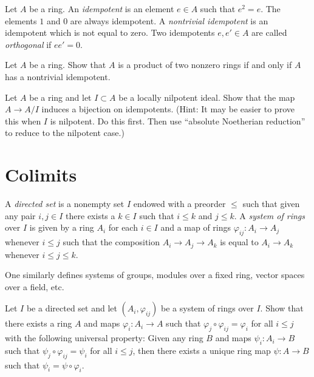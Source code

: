 \noindent
Let $A$ be a ring. An {\it idempotent} is an element $e \in A$
such that $e^2 = e$. The elements $1$ and $0$ are always idempotent.
A {\it nontrivial idempotent} is an idempotent which is not
equal to zero. Two idempotents $e, e' \in A$ are called {\it orthogonal}
if $ee' = 0$.

\begin{exercise}
\label{exercise-product}
Let $A$ be a ring. Show that $A$ is a product of two nonzero rings if
and only if $A$ has a nontrivial idempotent.
\end{exercise}

\begin{exercise}
\label{exercise-lift-idempotents}
Let $A$ be a ring and let $I \subset A$ be a locally nilpotent ideal.
Show that the map $A \to A/I$ induces a bijection on idempotents.
(Hint: It may be easier to prove this when $I$ is nilpotent. Do this first.
Then use ``absolute Noetherian reduction'' to reduce to the nilpotent case.)
\end{exercise}








\section{Colimits}
\label{section-colimits}


\begin{definition}
\label{definition-directed-poset}
A {\it directed set} is a nonempty set $I$ endowed with a preorder $\leq$
such that given any pair $i, j \in I$ there exists a $k \in I$ such that
$i \leq k$ and $j \leq k$. A {\it system of rings} over $I$ is given by a
ring $A_i$ for each $i \in I$ and a map of rings $\varphi_{ij} : A_i \to A_j$
whenever $i \leq j$ such that the composition $A_i \to A_j \to A_k$ is equal to
$A_i \to A_k$ whenever $i \leq j \leq k$.
\end{definition}

\noindent
One similarly defines systems of groups, modules over a fixed ring,
vector spaces over a field, etc.

\begin{exercise}
\label{exercise-directed-colimit}
Let $I$ be a directed set and let
$(A_i, \varphi_{ij})$ be a system of rings over $I$.
Show that there exists a ring $A$ and maps $\varphi_i : A_i \to A$
such that $\varphi_j \circ \varphi_{ij} = \varphi_i$ for all $i \leq j$
with the following universal property: Given any ring $B$
and maps $\psi_i : A_i \to B$ such that
$\psi_j \circ \varphi_{ij} = \psi_i$ for all $i \leq j$, then
there exists a unique ring map $\psi : A \to B$ such that
$\psi_i = \psi \circ \varphi_i$.
\end{exercise}

